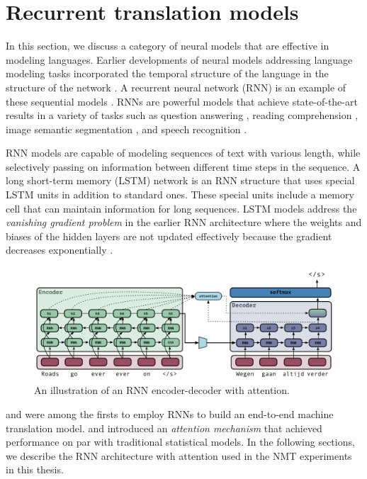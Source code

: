 \section{Recurrent translation models} \label{RNN}

In this section, we discuss a category of neural models that are effective in modeling languages. 
Earlier developments of neural models addressing language modeling tasks incorporated the temporal structure of the language in the structure of the network \citep{Jacquemin1994ATC,Schmidhuber:HabilitationThesis}.  
A recurrent neural network (RNN) is an example of these sequential models \citep{10.5555/65669.104451}.
RNNs are powerful models that achieve state-of-the-art results in a variety of tasks such as question answering \citep{garg2019tanda}, reading comprehension \citep{Zhang2020RetrospectiveRF}, image semantic segmentation \citep{yuan2019objectcontextual}, and speech recognition \citep{8049322}. 

RNN models are capable of modeling sequences of text with various length, while selectively passing on information between different time steps in the sequence. 
A long short-term memory (LSTM) network \citep{hochreiter1997long} is an RNN structure that uses special LSTM units in addition to standard ones. 
These special units include a memory cell that can maintain information for long sequences.
LSTM models address the \textit{vanishing gradient problem} in the earlier RNN architecture where the weights and biases of the hidden layers are not updated effectively because the gradient decreases exponentially \citep{10.1142/S0218488598000094}. 

\begin{figure}[htb!]
\centering
\includegraphics[width=0.95\linewidth]{02-background/figs/rnnarc.pdf}
\caption{An illustration of an RNN encoder-decoder with attention.}
\label{bgRNNfig}
\end{figure}

\citet{sutskever2014sequence} and \citet{cho2014properties} were among the firsts to employ RNNs to build an end-to-end machine translation model.
\citet{DBLP:journals/corr/BahdanauCB14} and \citet{luong:2015:EMNLP} introduced an \textit{attention mechanism} that achieved performance on par with traditional statistical models. 
In the following sections, we describe the RNN architecture with attention used in the NMT experiments in this thesis. 


